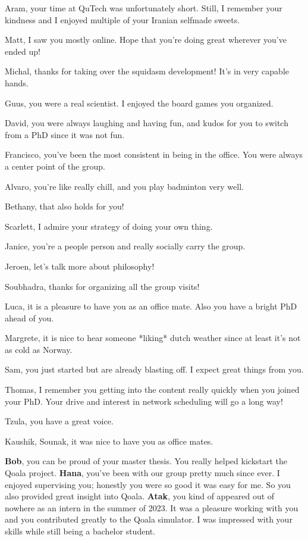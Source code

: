 Aram, your time at QuTech was unfortunately short. Still, I remember your kindness and I enjoyed multiple of your Iranian selfmade sweets.

Matt, I saw you mostly online. Hope that you're doing great wherever you've ended up!

Michal, thanks for taking over the squidasm development! It's in very capable hands.

Guus, you were a real scientist. I enjoyed the board games you organized.

David, you were always laughing and having fun, and kudos for you to switch from a PhD since it was not fun.

Francisco, you've been the most consistent in being in the office. You were always a center point of the group.

Alvaro, you're like really chill, and you play badminton very well. 

Bethany, that also holds for you!

Scarlett, I admire your strategy of doing your own thing.

Janice, you're a people person and really socially carry the group.

Jeroen, let's talk more about philosophy!

Soubhadra, thanks for organizing all the group visits!

Luca, it is a pleasure to have you as an office mate. Also you have a bright PhD ahead of you.

Margrete, it is nice to hear someone *liking* dutch weather since at least it's not as cold as Norway.

Sam, you just started but are already blasting off. I expect great things from you.

Thomas, I remember you getting into the content really quickly when you joined your PhD. Your drive and interest in network scheduling will go a long way!

Tzula, you have a great voice.

Kaushik, Sounak, it was nice to have you as office mates.

\textbf{Bob}, you can be proud of your master thesis. You really helped kickstart the Qoala project.
\textbf{Hana}, you've been with our group pretty much since ever. I enjoyed supervising you; honestly you were so good it was easy for me.
So you also provided great insight into Qoala.
\textbf{Atak}, you kind of appeared out of nowhere as an intern in the summer of 2023. It was a pleasure working with you and you contributed greatly to the Qoala simulator. I was impressed with your skills while still being a bachelor student.

